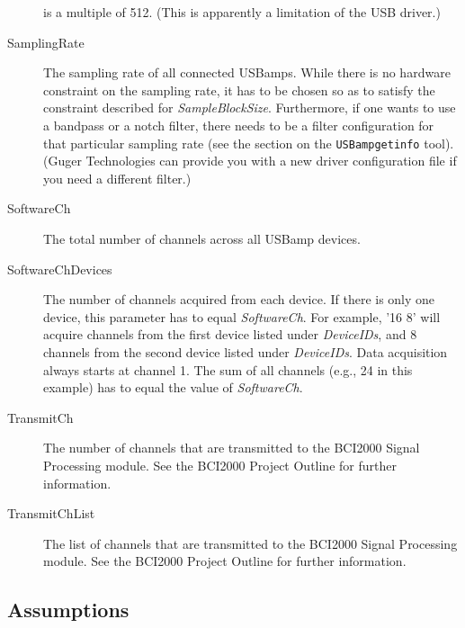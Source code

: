 \documentclass[letterpaper, oneside, 12pt]{article}
\begin{document}
\begin{description}
                           is a multiple of 512. (This is apparently a limitation of
                           the USB driver.)
 \item [SamplingRate]      The sampling rate of all connected USBamps. While there is
                           no hardware constraint on the sampling rate, it has to
                           be chosen so as to satisfy the constraint described for
                           \textit{SampleBlockSize}. Furthermore, if one wants to 
                           use a bandpass or a notch filter, there needs to be a filter
                           configuration for that particular sampling rate (see the section
                           on the \texttt{USBampgetinfo} tool). (Guger Technologies can
                           provide you with a new driver configuration file if you need
                           a different filter.)
 \item [SoftwareCh]        The total number of channels across all USBamp devices.
 \item [SoftwareChDevices] The number of channels acquired from each device. 
                           If there is only one device, this parameter has to equal \textit{SoftwareCh}.
                           For example, '16 8' will acquire channels from the 
                           first device listed under \textit{DeviceIDs}, and 8 channels
                           from the second device listed under \textit{DeviceIDs}.
                           Data acquisition always starts at channel 1.
                           The sum of all channels (e.g., 24 in this example) has to 
                           equal the value of \textit{SoftwareCh}.
 \item [TransmitCh]        The number of channels that are transmitted to the BCI2000 
                           Signal Processing module. See the BCI2000 Project
                           Outline for further information.
 \item [TransmitChList]    The list of channels that are transmitted to the BCI2000 
                           Signal Processing module. See the BCI2000 Project
                           Outline for further information.                                                                        
\end{description}


\subsection{Assumptions}
\end{document}

